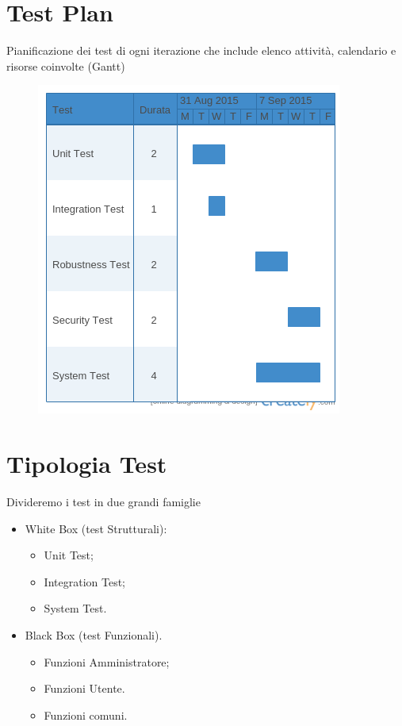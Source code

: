 \documentclass[a4paper,12pt]{article}
\begin{document}
\pagebreak

\section{Test Plan}
Pianificazione dei test di ogni iterazione che include elenco attività, calendario e risorse coinvolte (Gantt)
\begin{figure}[ht]
\centering
\includegraphics[trim={0 0.5cm 0 0}, clip, scale=0.5]{test.png}
\end{figure}



\section{Tipologia Test}
Divideremo i test in due grandi famiglie
\begin{itemize}	

\item White Box (test Strutturali):
\begin{itemize}	

\item Unit Test;
\item Integration Test;
\item System Test.

\end{itemize}

\item Black Box (test Funzionali).

\begin{itemize}	

\item Funzioni Amministratore;
\item Funzioni Utente.
\item Funzioni comuni.

\end{itemize}

\end{itemize}
\end{document}
